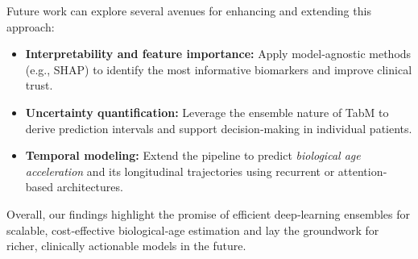 \documentclass[manuscript,screen,review]{acmart}
\begin{document}
Future work can explore several avenues for enhancing and extending this approach:
\begin{itemize}
  \item \textbf{Interpretability and feature importance:} Apply model‐agnostic methods (e.g., SHAP) to identify the most informative biomarkers and improve clinical trust.
  \item \textbf{Uncertainty quantification:} Leverage the ensemble nature of TabM to derive prediction intervals and support decision‐making in individual patients.
  \item \textbf{Temporal modeling:} Extend the pipeline to predict \emph{biological age acceleration} and its longitudinal trajectories using recurrent or attention‐based architectures.
\end{itemize}

Overall, our findings highlight the promise of efficient deep‐learning ensembles for scalable, cost‐effective biological‐age estimation and lay the groundwork for richer, clinically actionable models in the future.



\end{document}
